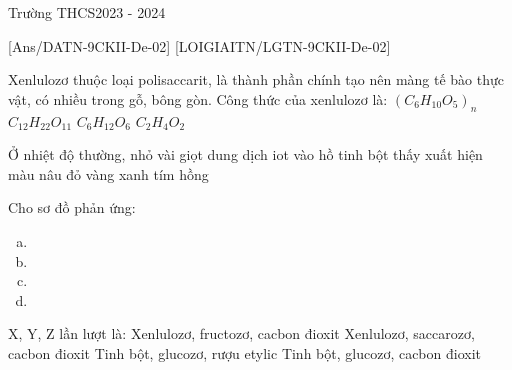 \begin{name}{Trường THCS}{2023 - 2024}
\end{name}
[Ans/DATN-9CKII-De-02]
{}[LOIGIAITN/LGTN-9CKII-De-02]
\begin{ex}[QG. 18-203]Xenlulozơ thuộc loại polisaccarit, là thành phần chính tạo nên màng tế bào thực vật, có nhiều trong gỗ, bông gòn. Công thức của xenlulozơ là:
	\choice
	{\True $\left(C_6{H}_{10} O_5\right)_n$}
	{$C_{12} H_{22} O_{11}$}
	{$C_6H_{12} O_6$}
	{$C_2H_4O_2$}
\end{ex}
\begin{ex}
	Ở nhiệt độ thường, nhỏ vài giọt dung dịch iot vào hồ tinh bột thấy xuất hiện màu
	\choice
	{nâu đỏ}
	{vàng}
	{\True xanh tím}
	{hồng}
\end{ex}
\begin{ex}
	Cho sơ đồ phản ứng: 
	\begin{enumerate}[a)]
		\item {}
		\item {}
		\item {}
		\item {}
	\end{enumerate}
	X, Y, Z lần lượt là:
	\choice
	{Xenlulozơ, fructozơ, cacbon đioxit}
	{Xenlulozơ, saccarozơ, cacbon đioxit}
	{Tinh bột, glucozơ, rượu etylic}
	{\True Tinh bột, glucozơ, cacbon đioxit}
\end{ex}
